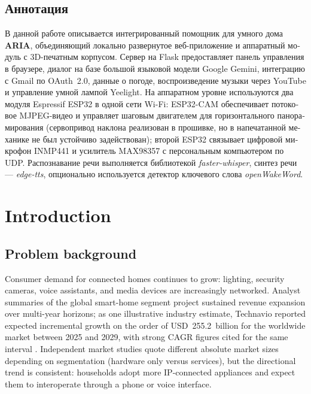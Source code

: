 \documentclass[12pt,a4paper]{report}
\begin{document}
\begin{otherlanguage}{russian}
\chapter*{Аннотация}
В данной работе описывается интегрированный помощник для умного дома \textbf{ARIA}, объединяющий локально развернутое веб-приложение и аппаратный модуль с 3D-печатным корпусом. Сервер на Flask предоставляет панель управления в браузере, диалог на базе большой языковой модели Google Gemini, интеграцию с Gmail по OAuth~2.0, данные о погоде, воспроизведение музыки через YouTube и управление умной лампой Yeelight. На аппаратном уровне используются два модуля Espressif ESP32 в одной сети Wi-Fi: ESP32-CAM обеспечивает потоковое MJPEG-видео и управляет шаговым двигателем для горизонтального панорамирования (сервопривод наклона реализован в прошивке, но в напечатанной механике не был устойчиво задействован); второй ESP32 связывает цифровой микрофон INMP441 и усилитель MAX98357 с персональным компьютером по UDP. Распознавание речи выполняется библиотекой \textit{faster-whisper}, синтез речи --- \textit{edge-tts}, опционально используется детектор ключевого слова \textit{openWakeWord}.
\end{otherlanguage}

\tableofcontents
\listoffigures
\listoftables

\chapter{Introduction}

\section{Problem background}

Consumer demand for connected homes continues to grow: lighting, security cameras, voice assistants, and media devices are increasingly networked. Analyst summaries of the global smart-home segment project sustained revenue expansion over multi-year horizons; as one illustrative industry estimate, Technavio reported expected incremental growth on the order of USD~255.2~billion for the worldwide market between 2025 and 2029, with strong CAGR figures cited for the same interval \cite{technavio}. Independent market studies quote different absolute market sizes depending on segmentation (hardware only versus services), but the directional trend is consistent: households adopt more IP-connected appliances and expect them to interoperate through a phone or voice interface.
\end{document}
